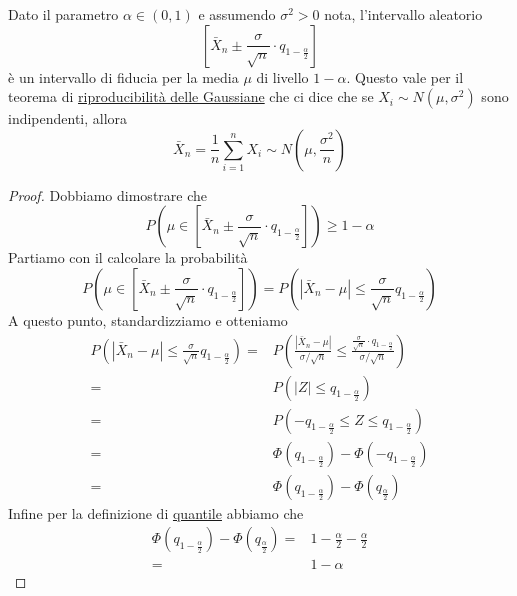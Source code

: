 \begin{proposition}
	Dato il parametro $\alpha \in (0,1)$ e assumendo $\sigma^2 > 0$ nota, l'intervallo aleatorio
	\[
		\left[ \bar{X}_n \pm \frac{\sigma}{\sqrt{n}} \cdot q_{1 - \frac{\alpha}{2}} \right]
	\]
	è un intervallo di fiducia per la media $\mu$ di livello $1 - \alpha$. Questo vale per il
	teorema di \hyperref[prop: riprod_gauss]{riproducibilità delle Gaussiane} che ci dice che se
	$X_i \sim N(\mu, \sigma^2)$ sono indipendenti, allora
	\[
		\bar{X}_n = \frac{1}{n} \sum_{i=1}^n X_i \sim
		N \left( \mu, \frac{\sigma^2}{n} \right)
	\]
	\begin{proof}
		Dobbiamo dimostrare che
		\[
			P \left( \mu \in \left[ \bar{X}_n \pm \frac{\sigma}{\sqrt{n}}
				\cdot q_{1-\frac{\alpha}{2}} \right] \right) \geq 1 - \alpha
		\]
		Partiamo con il calcolare la probabilità
		\[
			P \left( \mu \in \left[ \bar{X}_n \pm
				\frac{\sigma}{\sqrt{n}} \cdot q_{1-\frac{\alpha}{2}} \right] \right) =
			P \left( \left| \bar{X}_n - \mu \right| \leq
			\frac{\sigma}{\sqrt{n}} q_{1 - \frac{\alpha}{2}} \right)
		\]
		A questo punto, standardizziamo e otteniamo
		\begin{align*}
			P \left( |\bar{X}_n - \mu| \leq
			\frac{\sigma}{\sqrt{n}} q_{1 - \frac{\alpha}{2}} \right) = &
			P \left( \frac{|\bar{X}_n - \mu|}{\sigma / \sqrt{n}} \leq
			\frac{\frac{\sigma}{\sqrt{n}} \cdot q_{1-\frac{\alpha}{2}}}{\sigma/\sqrt{n}} \right) \\
			=                                                          &
			P \left( |Z| \leq q_{1 - \frac{\alpha}{2}} \right)                                   \\
			=                                                          &
			P \left( -q_{1 - \frac{\alpha}{2}} \leq Z \leq q_{1-\frac{\alpha}{2}} \right)        \\
			=                                                          &
			\Phi \left( q_{1-\frac{\alpha}{2}} \right) -
			\Phi \left(-q_{1-\frac{\alpha}{2}} \right)                                           \\
			=                                                          &
			\Phi \left( q_{1-\frac{\alpha}{2}} \right) -
			\Phi \left(q_{\frac{\alpha}{2}} \right)
		\end{align*}
		Infine per la definizione di \hyperref[def: quantile]{quantile} abbiamo che
		\begin{align*}
			\Phi \left( q_{1-\frac{\alpha}{2}} \right) -
			\Phi \left(q_{\frac{\alpha}{2}} \right) = & 1 - \frac{\alpha}{2} -
			\frac{\alpha}{2}                                                   \\
			=                                         & 1 - \alpha
		\end{align*}
	\end{proof}
\end{proposition}

